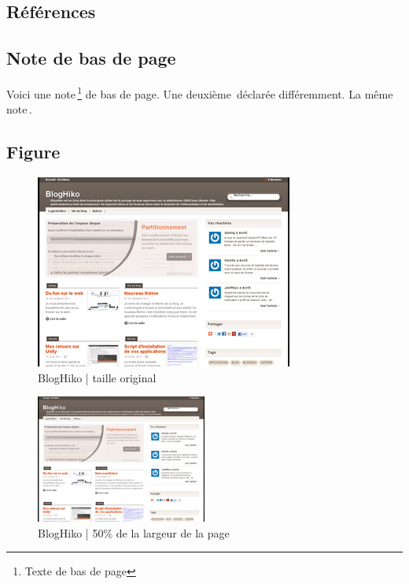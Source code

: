 \documentclass[a4paper,11pt,final]{article}
\begin{document}
\subsection{Références}




\subsection{Note de bas de page}

Voici une note\,\footnote{Texte de bas de page} de bas de page.
Une deuxième\,\footnotemark{} déclarée différemment.
La même note\,\footnotemark[\value{footnote}].



\subsection{Figure}

\begin{figure}[!ht]
    \center
    \includegraphics[]{./images/bloghiko.jpg}
    \caption{BlogHiko | taille original}
    \label{bloghiko}
\end{figure}

\begin{figure}[!ht]
    \center
    \includegraphics[width=0.5\textwidth]{./images/bloghiko.jpg}
    \caption{BlogHiko | 50\% de la largeur de la page}
\end{figure}
\end{document}
